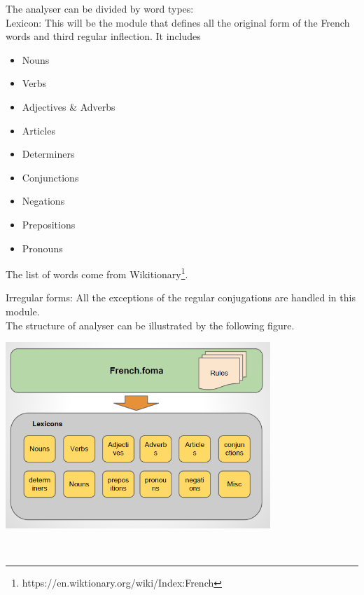 \documentclass[11pt,letterpaper]{article}
\begin{document}
The analyser can be divided by word types:\\
\indent Lexicon: This will be the module that defines all the original form of the French words and third regular inflection. It includes\\
\begin{itemize}
\item Nouns
\item Verbs
\item Adjectives \& Adverbs
\item Articles
\item Determiners
\item Conjunctions
\item Negations
\item Prepositions
\item Pronouns
\end{itemize}
The list of words come from Wikitionary\footnote{https://en.wiktionary.org/wiki/Index:French}.

\indent Irregular forms: All the exceptions of the regular conjugations are handled in this module.\\

The structure of analyser can be illustrated by the following figure.\\
\centerline{\includegraphics[width=100mm]{img/analyser.png}}\\
\end{document}
